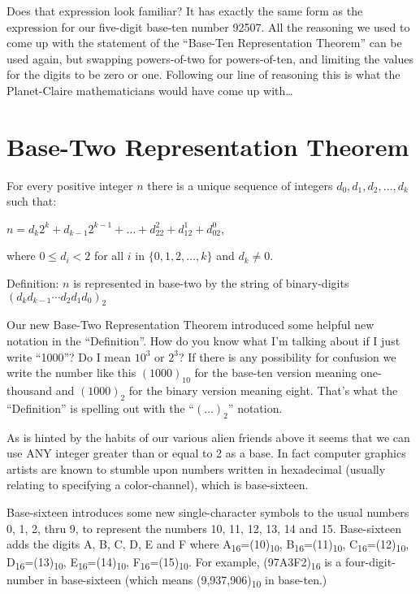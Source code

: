 \documentclass{article}
\newenvironment{jprIn}{\begin{adjustwidth}{2em}{}}{\end{adjustwidth}}
\begin{document}
Does that expression look familiar? It has exactly the same form
as the expression for our five-digit base-ten number 92507.
All the reasoning we used to come up with the statement of the ``Base-Ten
Representation Theorem'' can be used again, but swapping powers-of-two
for powers-of-ten, and limiting the values for the digits
to be zero or one.
Following our line of reasoning this is what the Planet-Claire mathematicians would have
come up with\dots

\break
\section*{Base-Two Representation Theorem}
\begin{jprIn}
For every positive integer $n$ there is a unique
sequence of integers $d_0, d_1, d_2,\dots{},d_k$ such that:

\hspace{3em}$n=d_k2^k+d_{k-1}2^{k-1}+\dots+d_22^2+d_12^1+d_02^0$,

where $0\le{}d_i<2$ for all $i$ in $\{0,1,2,\dots{},k\}$ and $d_k\ne0$.

Definition: $n$ is represented in base-two by the string
of binary-digits $(d_kd_{k-1}{\cdots}d_2d_1d_0)_2$
\end{jprIn}
\bigskip

Our new Base-Two Representation Theorem introduced some helpful new notation in the ``Definition''.
How do you know what I'm talking about if I just
write ``1000''? Do I mean $10^3$ or $2^3$?
If there is any possibility for confusion we write
the number like this $(1000)_{10}$ 
for the base-ten version meaning one-thousand and $(1000)_2$
for the binary version meaning eight.
That's what the ``Definition'' is spelling out with the ``$(\dots)_2$'' notation.

As is hinted by the habits of our various alien friends
above it seems that we can use ANY integer greater than
or equal to 2 as a base.
In fact computer graphics artists are known
to stumble upon numbers written in hexadecimal (usually relating to specifying a color-channel),
which is base-sixteen.

Base-sixteen introduces some new single-character symbols to the usual numbers 0, 1,
2, thru 9,
to represent the numbers 10, 11, 12, 13, 14 and 15.
Base-sixteen adds the digits A, B, C, D, E and F where
A\textsubscript{16}=(10)\textsubscript{10},
B\textsubscript{16}=(11)\textsubscript{10},
C\textsubscript{16}=(12)\textsubscript{10},
D\textsubscript{16}=(13)\textsubscript{10},
E\textsubscript{16}=(14)\textsubscript{10},
F\textsubscript{16}=(15)\textsubscript{10}.
For example, (97A3F2)\textsubscript{16} is a four-digit-number in base-sixteen
(which means (9,937,906)\textsubscript{10} in base-ten.)
\end{document}
